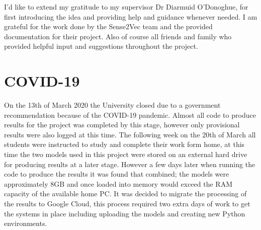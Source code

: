 I’d like to extend my gratitude to my supervisor Dr Diarmuid O'Donoghue, for first introducing the idea and providing help and guidance whenever needed. I am grateful for the work done by the Sense2Vec team and the provided documentation for their project. Also of course all friends and family who provided helpful input and suggestions throughout the project.

\section*{COVID-19}
On the 13th of March 2020 the University closed due to a government recommendation because of the COVID-19 pandemic. Almost all code to produce results for the project was completed by this stage, however only provisional results were also logged at this time. The following week on the 20th of March all students were instructed to study and complete their work form home, at this time the two models used in this project were stored on an external hard drive for producing results at a later stage. However a few days later when running the code to produce the results it was found that combined; the models were approximately 8GB and once loaded into memory would exceed the RAM capacity of the available home PC. It was decided to migrate the processing of the results to Google Cloud, this process required two extra days of work to get the systems in place including uploading the models and creating new Python environments.